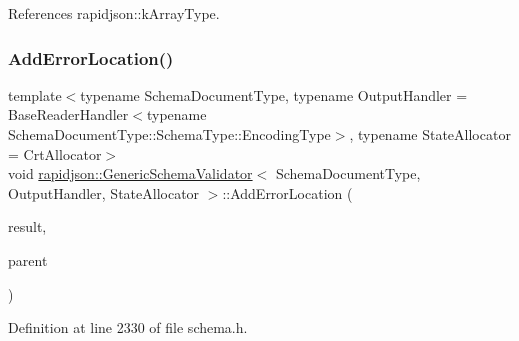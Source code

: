 References rapidjson\+::k\+Array\+Type.

\mbox{\label{classrapidjson_1_1_generic_schema_validator_a0094311f0ad58f1884855db80a1f2296}} 
\subsubsection{\texorpdfstring{AddErrorLocation()}{AddErrorLocation()}}
{\footnotesize\ttfamily template$<$typename Schema\+Document\+Type, typename Output\+Handler = Base\+Reader\+Handler$<$typename Schema\+Document\+Type\+::\+Schema\+Type\+::\+Encoding\+Type$>$, typename State\+Allocator = Crt\+Allocator$>$ \\
void \mbox{\hyperlink{classrapidjson_1_1_generic_schema_validator}{rapidjson\+::\+Generic\+Schema\+Validator}}$<$ Schema\+Document\+Type, Output\+Handler, State\+Allocator $>$\+::Add\+Error\+Location (\begin{DoxyParamCaption}\item[{\mbox{\hyperlink{classrapidjson_1_1_generic_schema_validator_a14216aea798d69f102987c1aae36e897}{Value\+Type}} \&}]{result,  }\item[{bool}]{parent }\end{DoxyParamCaption})\hspace{0.3cm}{\ttfamily [private]}}



Definition at line 2330 of file schema.\+h.


